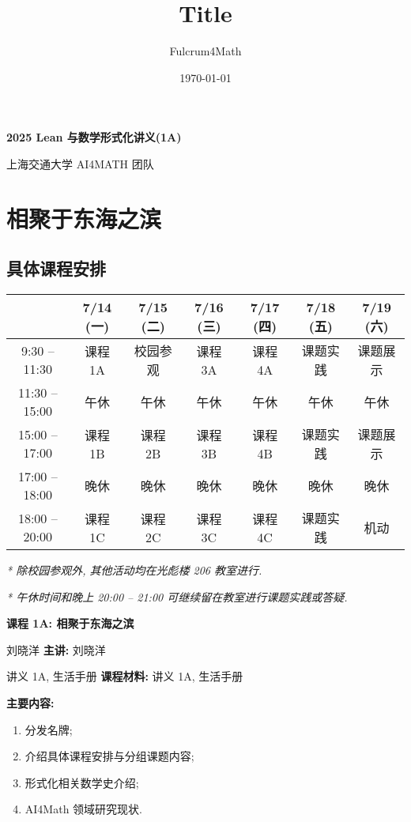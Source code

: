 \documentclass[UTF8]{ctexart}
\title{Title}
\author{Fulcrum4Math}
\date{\today}
\DeclareMathOperator{\0}{\mathbf{0}}                    %
\newcommand{\<}{\langle}
\renewcommand{\>}{\rangle}                              %
\newenvironment{thm_box}{
    \begin{tcolorbox}[enhanced, colback=thm_blue2, boxrule=0pt, frame hidden,
        borderline west={0.7mm}{0.1mm}{thm_blue1},breakable]
    }
    {\end{tcolorbox}}
\theoremstyle{MyStyle} %
\newenvironment{crs}[4]
{
    \begin{thm_box}
        \textbf{课程 #1: #2}
        
        \ifx\relax#3\relax\else %
            \textbf{主讲: }#3 %
        \fi
        
        \ifx\relax#4\relax\else %
            \textbf{课程材料: }#4 %
        \fi

        \textbf{主要内容: }
}
{
    \end{thm_box}
}
\begin{document}
    \begin{center}
        {\LARGE\textbf{2025 Lean 与数学形式化讲义(1A)}}

        上海交通大学 AI4MATH 团队
    \end{center}

    \setcounter{section}{-1}
    \section{相聚于东海之滨}
        
        \subsection{具体课程安排}
            
            \begin{center}
                \begin{tabular}{|c|c|c|c|c|c|c|}
                    \hline
                     & 7/14 (一) & 7/15 (二) & 7/16 (三) & 7/17 (四) & 7/18 (五) & 7/19 (六) \\
                    \hline
                    9:30 -- 11:30 & 课程 1A & 校园参观 & 课程 3A & 课程 4A & 课题实践 & 课题展示\\
                    \hline
                    11:30 -- 15:00 & 午休 & 午休 & 午休 & 午休 & 午休 & 午休\\
                    \hline
                    15:00 -- 17:00 & 课程 1B & 课程 2B & 课程 3B & 课程 4B & 课题实践 & 课题展示\\
                    \hline
                    17:00 -- 18:00 & 晚休 & 晚休 & 晚休 & 晚休 & 晚休 & 晚休\\
                    \hline
                    18:00 -- 20:00 & 课程 1C & 课程 2C & 课程 3C & 课程 4C & 课题实践 & 机动\\
                    \hline
                \end{tabular}
            \end{center}
            
            \textit{* 除校园参观外, 其他活动均在光彪楼 206 教室进行. }

            \textit{* 午休时间和晚上 20:00 -- 21:00 可继续留在教室进行课题实践或答疑. }

            \begin{crs}
                {1A}
                {相聚于东海之滨}
                {刘晓洋}
                {讲义 1A, 生活手册}
                \begin{enumerate}
                    \item 分发名牌; 
                    \item 介绍具体课程安排与分组课题内容; 
                    \item 形式化相关数学史介绍; 
                    \item AI4Math 领域研究现状. 
                \end{enumerate}
            \end{crs}
\end{document}
